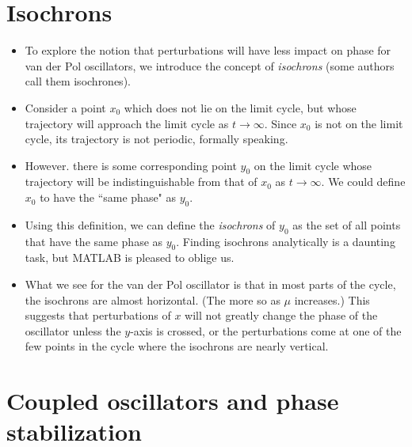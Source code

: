 \documentclass{article}
\begin{document}
\section*{Isochrons}
\begin{itemize}
\item To explore the notion that perturbations will have less impact on phase for van der Pol oscillators, we introduce the concept of \textit{isochrons} (some authors call them isochrones).

\item Consider a point $x_0$ which does not lie on the limit cycle, but whose trajectory will approach the limit cycle as $t \to \infty$. Since $x_0$ is not on the limit cycle, its trajectory is not periodic, formally speaking.

\item However. there is some corresponding point $y_0$ on the limit cycle whose trajectory will be indistinguishable from that of $x_0$ as $t \to \infty$. We could define $x_0$ to have the ``same phase" as $y_0$.

\item Using this definition, we can define the \textit{isochrons} of $y_0$ as the set of all points that have the same phase as $y_0$. Finding isochrons analytically is a daunting task, but MATLAB is pleased to oblige us.

\item What we see for the van der Pol oscillator is that in most parts of the cycle, the isochrons are almost horizontal. (The more so as $\mu$ increases.) This suggests that perturbations of $x$ will not greatly change the phase of the oscillator unless the $y$-axis is crossed, or the perturbations come at one of the few points in the cycle where the isochrons are nearly vertical.

\end{itemize}

\section*{Coupled oscillators and phase stabilization}
\end{document}
